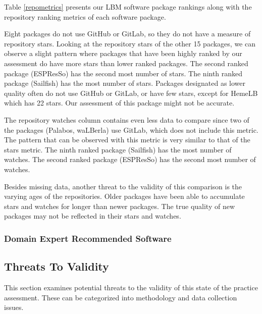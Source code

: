 \documentclass[12pt, notitlepage]{article}
\begin{document}
Table \ref{repometrics} presents our LBM software package rankings along with the repository ranking metrics of each software package. 

Eight packages do not use GitHub or GitLab, so they do not have a measure of repository stars. Looking at the repository stars of the other 15 packages, we can observe a slight pattern where packages that have been highly ranked by our assessment do have more stars than lower ranked packages. The second ranked package (ESPResSo) has the second most number of stars. The ninth ranked package (Sailfish) has the most number of stars. Packages designated as lower quality often do not use GitHub or GitLab, or have few stars, except for HemeLB which has 22 stars. Our assessment of this package might not be accurate. 

The repository watches column contains even less data to compare since two of the packages (Palabos, waLBerla) use GitLab, which does not include this metric. The pattern that can be observed with this metric is very similar to that of the stars metric. The ninth ranked package (Sailfish) has the most number of watches. The second ranked package (ESPResSo) has the second most number of watches.

Besides missing data, another threat to the validity of this comparison is the varying ages of the repositories. Older packages have been able to accumulate stars and watches for longer than newer packages. The true quality of new packages may not be reflected in their stars and watches. 

\subsubsection{Domain Expert Recommended Software}\label{domainexpertrecommend}

\subsection{Threats To Validity}\label{threats}

This section examines potential threats to the validity of this state of the practice assessment. These can be categorized into methodology and data collection issues. 
\end{document}
